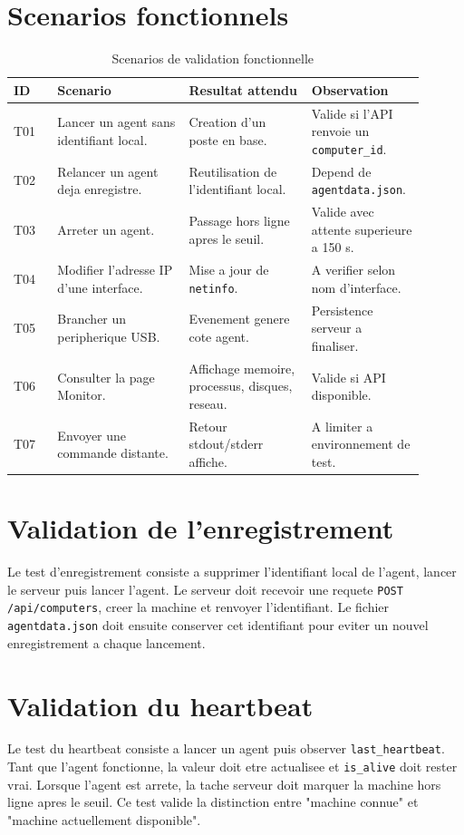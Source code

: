 \documentclass[12pt,a4paper]{report}
\begin{document}
\section{Scenarios fonctionnels}
\begin{longtable}{p{0.10\linewidth}p{0.30\linewidth}p{0.28\linewidth}p{0.22\linewidth}}
\caption{Scenarios de validation fonctionnelle}\\
\toprule
\textbf{ID} & \textbf{Scenario} & \textbf{Resultat attendu} & \textbf{Observation}\\
\midrule
T01 & Lancer un agent sans identifiant local. & Creation d'un poste en base. & Valide si l'API renvoie un \texttt{computer\_id}.\\
T02 & Relancer un agent deja enregistre. & Reutilisation de l'identifiant local. & Depend de \texttt{agentdata.json}.\\
T03 & Arreter un agent. & Passage hors ligne apres le seuil. & Valide avec attente superieure a 150 s.\\
T04 & Modifier l'adresse IP d'une interface. & Mise a jour de \texttt{netinfo}. & A verifier selon nom d'interface.\\
T05 & Brancher un peripherique USB. & Evenement genere cote agent. & Persistence serveur a finaliser.\\
T06 & Consulter la page Monitor. & Affichage memoire, processus, disques, reseau. & Valide si API disponible.\\
T07 & Envoyer une commande distante. & Retour stdout/stderr affiche. & A limiter a environnement de test.\\
\bottomrule
\end{longtable}

\section{Validation de l'enregistrement}
Le test d'enregistrement consiste a supprimer l'identifiant local de l'agent, lancer le serveur puis lancer l'agent. Le serveur doit recevoir une requete \texttt{POST /api/computers}, creer la machine et renvoyer l'identifiant. Le fichier \texttt{agentdata.json} doit ensuite conserver cet identifiant pour eviter un nouvel enregistrement a chaque lancement.

\section{Validation du heartbeat}
Le test du heartbeat consiste a lancer un agent puis observer \texttt{last\_heartbeat}. Tant que l'agent fonctionne, la valeur doit etre actualisee et \texttt{is\_alive} doit rester vrai. Lorsque l'agent est arrete, la tache serveur doit marquer la machine hors ligne apres le seuil. Ce test valide la distinction entre "machine connue" et "machine actuellement disponible".
\end{document}
